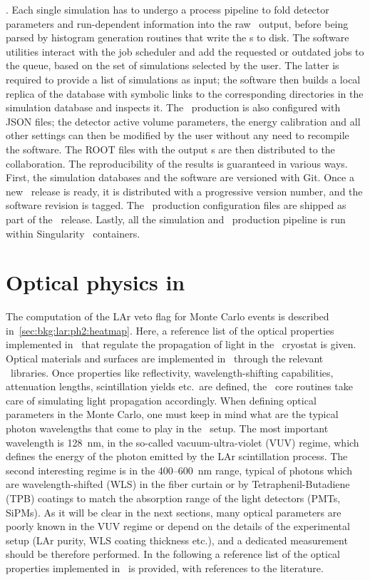 $${}. Each single simulation has to undergo a process pipeline to fold detector parameters
and run-dependent information into the raw \mage\ output, before being parsed by histogram
generation routines that write the \pdf{}s to disk. The software utilities interact with the
job scheduler and add the requested or outdated jobs to the queue, based on the set of
simulations selected by the user. The latter is required to provide a list of simulations
as input; the software then builds a local replica of the database with symbolic links to
the corresponding directories in the simulation database and inspects it. The \pdf\
production is also configured with JSON files; the detector active volume parameters, the
energy calibration and all other settings can then be modified by the user without any
need to recompile the software. The ROOT files with the output \pdf{}s are then distributed
to the collaboration.
\newpar
The reproducibility of the results is guaranteed in various ways. First, the simulation
databases and the software are versioned with Git. Once a new \pdf\ release is ready, it is
distributed with a progressive version number, and the software revision is tagged. The
\pdf\ production configuration files are shipped as part of the \pdf\ release. Lastly, all the
simulation and \pdf\ production pipeline is run within Singularity~\cite{Kurtzer2017,
Singularity2020} containers.

\section{Optical physics in \mage}%
\label{sec:apdx:mage-optics}

The computation of the LAr veto flag for Monte Carlo events is described
in~\cref{sec:bkg:lar:ph2:heatmap}. Here, a reference list of the optical properties
implemented in \mage\ that regulate the propagation of light in the \gerda\ cryostat is
given.
\newpar
Optical materials and surfaces are implemented in \mage\ through the relevant \geant\
libraries. Once properties like reflectivity, wavelength-shifting capabilities,
attenuation lengths, scintillation yields etc.~are defined, the \geant\ core routines take
care of simulating light propagation accordingly. When defining optical parameters in the
Monte Carlo, one must keep in mind what are the typical photon wavelengths that come to
play in the \gerda\ setup. The most important wavelength is 128~nm, in the so-called
vacuum-ultra-violet (VUV) regime, which defines the energy of the photon emitted by the
LAr scintillation process. The second interesting regime is in the 400--600~nm range,
typical of photons which are wavelength-shifted (WLS) in the fiber curtain or by
Tetraphenil-Butadiene (TPB) coatings to match the absorption range of the light detectors
(PMTs, SiPMs). As it will be clear in the next sections, many optical parameters are
poorly known in the VUV regime or depend on the details of the experimental setup (LAr
purity, WLS coating thickness etc.), and a dedicated measurement should be therefore
performed. In the following a reference list of the optical properties implemented in
\mage\ is provided, with references to the literature.

